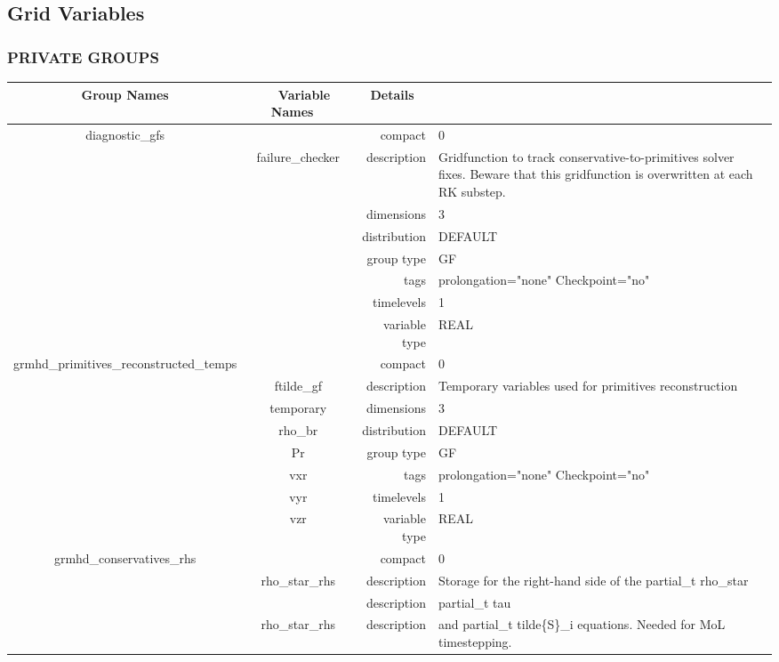 \documentclass{article}
\begin{document}
\subsection*{Grid Variables}
\vspace{5mm}\subsubsection{PRIVATE GROUPS}

\vspace{5mm}

\begin{tabular*}{150mm}{|c|c@{\extracolsep{\fill}}|rl|} \hline 
~ {\bf Group Names} ~ & ~ {\bf Variable Names} ~  &{\bf Details} ~ & ~\\ 
\hline 
diagnostic\_gfs &  & compact & 0 \\ 
 & failure\_checker & description & Gridfunction to track conservative-to-primitives solver fixes. Beware that this gridfunction is overwritten at each RK substep. \\ 
 &  & dimensions & 3 \\ 
 &  & distribution & DEFAULT \\ 
 &  & group type & GF \\ 
 &  & tags & prolongation="none" Checkpoint="no" \\ 
 &  & timelevels & 1 \\ 
 &  & variable type & REAL \\ 
\hline 
grmhd\_primitives\_reconstructed\_temps &  & compact & 0 \\ 
 & ftilde\_gf & description & Temporary variables used for primitives reconstruction \\ 
 & temporary & dimensions & 3 \\ 
 & rho\_br & distribution & DEFAULT \\ 
 & Pr & group type & GF \\ 
 & vxr & tags & prolongation="none" Checkpoint="no" \\ 
 & vyr & timelevels & 1 \\ 
 & vzr & variable type & REAL \\ 
\hline 
grmhd\_conservatives\_rhs &  & compact & 0 \\ 
 & rho\_star\_rhs & description & Storage for the right-hand side of the partial\_t rho\_star \\ 
& ~ & description &  partial\_t tau \\ 
 & rho\_star\_rhs & description &  and partial\_t tilde\{S\}\_i equations. Needed for MoL timestepping. \\ 

\end{tabular*}
\end{document}
